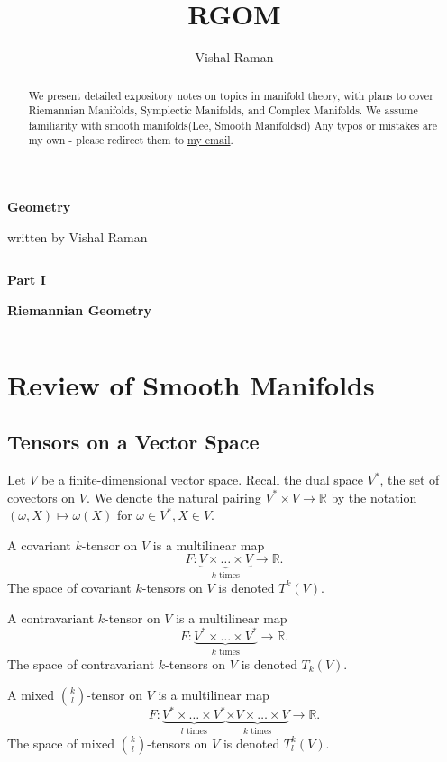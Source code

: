 \documentclass[11pt]{scrartcl}
\newcommand{\R}{\mathbb{R}}
\newcommand{\<}{\langle}
\renewcommand{\>}{\rangle}
\newcommand{\1}{\textbf{1}} %
\begin{document}
\title{RGOM}
\author{Vishal Raman}

\begin{center}
\centerline{ }
\centerline{\huge \textbf{Geometry}}
\centerline{written by Vishal Raman}
\end{center}
\begin{abstract}
We present detailed expository notes on topics in manifold theory, with plans to cover Riemannian Manifolds, Symplectic Manifolds, and Complex Manifolds. We assume familiarity with smooth manifolds(Lee, Smooth Manifoldsd) Any typos or mistakes are my own - please redirect them to \href{vraman@berkeley.edu}{my email}. 
\end{abstract}
\tableofcontents
\pagebreak
$ $
\vfill
\centerline{\huge \textbf{Part I}}
\centerline{}
\centerline{\huge \textbf{Riemannian Geometry}}
\vfill
$ $
\section{Review of Smooth Manifolds}
\subsection{Tensors on a Vector Space}
Let $V$ be a finite-dimensional vector space.  Recall the dual space $V^*$, the set of covectors on $V$.  We denote the natural pairing $V^* \times V \to \R$ by the notation $(\omega, X) \mapsto \omega(X)$ for $\omega \in V^*, X \in V$.

\begin{definition} A covariant $k$-tensor on $V$ is a multilinear map $$F: \underbrace{V \times \dots \times V}_{k \text{ times}}\to \R.$$
The space of covariant $k$-tensors on $V$ is denoted $T^k(V)$.
\end{definition}

\begin{definition} A contravariant $k$-tensor on $V$ is a multilinear map $$F: \underbrace{V^* \times \dots \times V^*}_{k \text{ times}} \to \R.$$
The space of contravariant $k$-tensors on $V$ is denoted $T_k(V)$.
\end{definition}

\begin{definition} A mixed $\binom{k}{l}$-tensor on $V$ is a multilinear map $$F: \underbrace{V^* \times \dots \times V^*}_{l \text{ times}} \underbrace{\times V \times \dots \times V}_{k \text{ times}} \to \R.$$
The space of mixed $\binom{k}{l}$-tensors on $V$ is denoted $T^k_l(V)$.
\end{definition}
\end{document}
